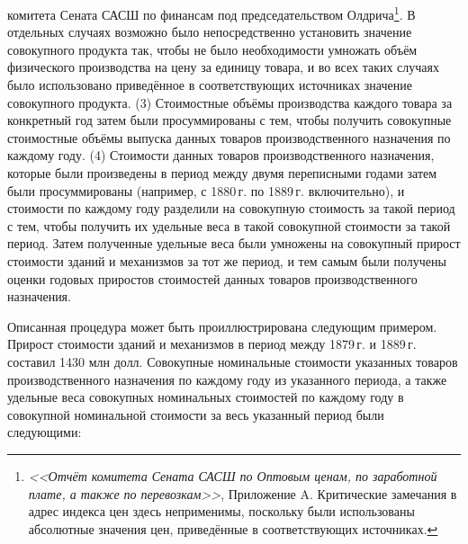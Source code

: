 \documentclass[leqno]{article}  %
\begin{document}
комитета Сената САСШ по финансам под председательством Олдрича\footnote{\emph{<<Отчёт комитета Сената САСШ по Оптовым ценам, по заработной плате, а также по перевозкам>>}, Приложение A. Критические замечания в адрес индекса цен здесь неприменимы, поскольку были использованы абсолютные значения цен, приведённые в соответствующих источниках.}. В отдельных случаях возможно было непосредственно установить значение совокупного продукта так, чтобы не было необходимости умножать объём физического производства на цену за единицу товара, и во всех таких случаях было использовано приведённое в соответствующих источниках значение совокупного продукта. (3) Стоимостные объёмы производства каждого товара за конкретный год затем были просуммированы с тем, чтобы получить совокупные стоимостные объёмы выпуска данных товаров производственного назначения по каждому году. (4) Стоимости данных товаров производственного назначения, которые были произведены в период между двумя переписными годами затем были просуммированы (например, с 1880\,г. по 1889\,г. включительно), и стоимости по каждому году разделили на совокупную стоимость за такой период с тем, чтобы получить их удельные веса в такой совокупной стоимости за такой период. Затем полученные удельные веса были умножены на совокупный прирост стоимости зданий и механизмов за тот же период, и тем самым были получены оценки годовых приростов стоимостей данных товаров производственного назначения.
\par
Описанная процедура может быть проиллюстрирована следующим примером. Прирост стоимости зданий и механизмов в период между 1879\,г. и 1889\,г. составил 1430 млн долл. Совокупные номинальные стоимости указанных товаров производственного назначения по каждому году из указанного периода, а также удельные веса совокупных номинальных стоимостей по каждому году в совокупной номинальной стоимости за весь указанный период были следующими:
\par
\end{document}
